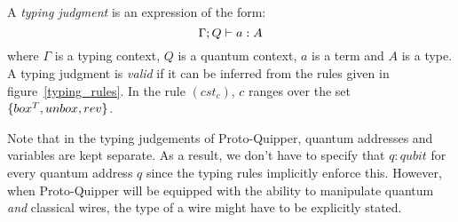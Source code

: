 \documentclass{article}
\begin{document}
\begin{definition}
A \emph{typing judgment} is an expression of the form:
\[
\Gamma ; Q \vdash a:A
\] 
where $\Gamma$ is a typing context, $Q$ is a quantum context, 
$a$ is a term and $A$ is a type. A typing judgment is \emph{valid} if it can 
be inferred from the rules given in figure~\hyperref[typing_rules]{\ref*{typing_rules}}. 
In the rule $(cst_c)$, $c$ ranges over the set $\{box^T, unbox, rev\}$.
\end{definition}

Note that in the typing judgements of Proto-Quipper, quantum addresses and variables are kept 
separate. As a result, we don't have to specify that $q:qubit$ for every quantum address 
$q$ since the typing rules implicitly enforce this. However, when Proto-Quipper will be 
equipped with the ability to manipulate quantum \emph{and} classical wires, the type of a 
wire might have to be explicitly stated.

\end{document}
